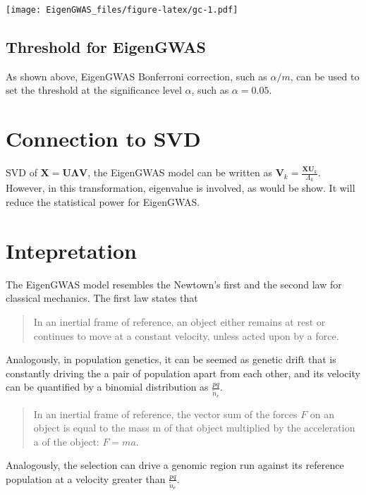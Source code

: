 \documentclass[]{book}
\begin{document}
\texttt{[image: EigenGWAS\_files/figure-latex/gc-1.pdf]}

\hypertarget{threshold-for-eigengwas}{%
\subsection{Threshold for EigenGWAS}\label{threshold-for-eigengwas}}

As shown above, EigenGWAS Bonferroni correction, such as \(\alpha/m\),
can be used to set the threshold at the significance level \(\alpha\),
such as \(\alpha=0.05\).

\hypertarget{connection-to-svd}{%
\section{Connection to SVD}\label{connection-to-svd}}

SVD of \(\mathbf{X}=\mathbf{U\Lambda V}\), the EigenGWAS model can be
written as \(\mathbf{V}_k=\frac{\mathbf{XU}_k}{\Lambda_k}\). However, in
this transformation, eigenvalue is involved, as would be show. It will
reduce the statistical power for EigenGWAS.

\hypertarget{intepretation}{%
\section{Intepretation}\label{intepretation}}

The EigenGWAS model resembles the Newtown's first and the second law for
classical mechanics. The first law states that

\begin{quote}
In an inertial frame of reference, an object either remains at rest or
continues to move at a constant velocity, unless acted upon by a force.
\end{quote}

Analogously, in population genetics, it can be seemed as genetic drift
that is constantly driving the a pair of population apart from each
other, and its velocity can be quantified by a binomial distribution as
\(\frac{pq}{\tilde{n}_e}\).

\begin{quote}
In an inertial frame of reference, the vector sum of the forces \(F\) on
an object is equal to the mass m of that object multiplied by the
acceleration a of the object: \(F = ma\).
\end{quote}

Analogously, the selection can drive a genomic region run against its
reference population at a velocity greater than
\(\frac{pq}{\tilde{n}_e}\).
\end{document}
